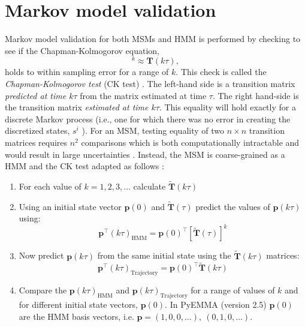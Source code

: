 \section{Markov model validation}\label{sec:model_validation}
Markov model validation for both MSMs and HMM is performed by checking to see if the Chapman-Kolmogorov equation,
\begin{equation}
[\mathbf{T}(\tau)]^{k} \approx \mathbf{T}(k \tau),
\end{equation}
holds to within sampling error for a range of $k$. This check is called the \emph{Chapman-Kolmogorov test} (CK test) \cite{prinzMarkovModelsMolecular2011}.  The left-hand side is a transition matrix \emph{predicted at time $k\tau$} from the matrix estimated at time $\tau$. The right hand-side is the transition matrix \emph{estimated at time $k\tau$}. This equality will hold exactly for a discrete Markov process (i.e., one for which there was no error in creating the discretized states, $s^i$ \cite{prinzMarkovModelsMolecular2011}). For an MSM, testing equality of two $n \times n$ transition matrices requires $n^{2}$ comparisons which is both computationally intractable and would result in large uncertainties \cite{prinzMarkovModelsMolecular2011}. Instead, the MSM is coarse-grained as a HMM and the CK test adapted as follows \cite{prinzMarkovModelsMolecular2011}:
\begin{enumerate}
    \item For each value of $k = 1, 2, 3, \ldots$ calculate $\widetilde{\mathbf{T}}(
    k\tau)$
    \item Using an initial state vector $\mathbf{p}(0)$ and $\widetilde{\mathbf{T}}(\tau)$ predict the values of $\mathbf{p}(k\tau)$ using: 
    \begin{equation*}
        \mathbf{p}^{\top}(k\tau)_{\mathrm{HMM}} = \mathbf{p}(0)^{\top}[\widetilde{\mathbf{T}}(\tau)]^{k}
    \end{equation*}
    \item Now predict $\mathbf{p}(k\tau)$ from the same initial state using the  $\widetilde{\mathbf{T}}(k\tau)$ matrices: 
    \begin{equation*}
        \mathbf{p}^{\top}(k\tau)_{\mathrm{Trajectory}} = \mathbf{p}(0)^{\top}\widetilde{\mathbf{T}}(k\tau)
    \end{equation*}
    \item Compare the $\mathbf{p}(k\tau)_{\mathrm{HMM}}$ and $\mathbf{p}(k\tau)_{\mathrm{Trajectory}}$ for a range of values of $k$ and for different initial state vectors, $\mathbf{p}(0)$. In PyEMMA (version 2.5) \cite{schererPyEMMASoftwarePackage2015a} $\mathbf{p}(0)$ are the HMM basis vectors, i.e. $\mathbf{p} = (1, 0, 0, \ldots),\ (0, 1, 0, \ldots)$. 
\end{enumerate}

